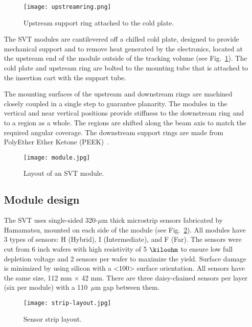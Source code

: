 \begin{figure}[hbt] 
\centering 
\texttt{[image: upstreamring.png]}
\caption{Upstream support ring attached to the cold plate.}
\label{fig:upstreamring}
\end{figure}

 The SVT modules are cantilevered off a chilled cold plate, designed to provide mechanical support and to remove heat generated by the electronics, located at the upstream end of the module outside of the tracking volume (see Fig.~\ref{fig:upstreamring}). The cold plate and upstream ring are bolted to the mounting tube that is attached to the insertion cart with the support tube. 
 
The mounting surfaces of the upstream and downstream rings are machined closely coupled in a single step to guarantee planarity. The modules in the vertical and near vertical positions provide stiffness to the downstream ring and to a region as a whole. The regions are shifted along the beam axis to match the required angular coverage. The downstream support rings are made from PolyEther Ether Ketone (PEEK)~\cite{NIMVCC}. 

\begin{figure}[hbt] 
\centering 
\texttt{[image: module.jpg]}
\caption{Layout of an SVT module.}
\label{fig:module}
\end{figure}

\subsection{Module design}

The SVT uses single-sided 320-$\mu$m thick microstrip sensors fabricated by Hamamatsu, mounted on each side of the module (see Fig.~\ref{fig:module}). All modules have 3 types of sensors: H (Hybrid), I (Intermediate), and F (Far). The sensors were cut from 6 inch wafers with high resistivity of 5 $\kiloohm$ to ensure low full depletion voltage and 2 sensors per wafer to maximize the yield. Surface damage is minimized by using silicon with a <100> surface orientation. All sensors have the same size, 112 mm $\times$ 42 mm. There are three daisy-chained sensors per layer (six per module) with a 110~$\mu$m gap between them. 

\begin{figure}[hbt] 
\centering 
\texttt{[image: strip-layout.jpg]}
\caption{Sensor strip layout.}
\label{fig:strip-layout}
\end{figure}

